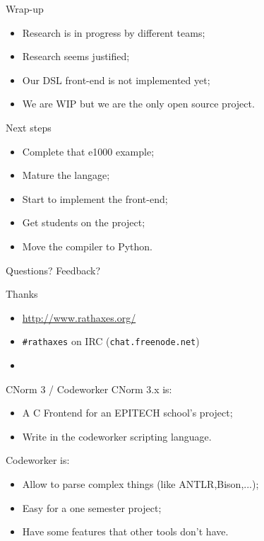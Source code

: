 \documentclass[xcolor={usenames,svgnames}]{beamer}
\begin{document}
\begin{frame}{Wrap-up}
\Large{
\begin{itemize}
\item Research is in progress by different teams;
\item Research seems justified;
\item Our DSL front-end is not implemented yet;
\item We are WIP but we are the only open source project.
\end{itemize}
}
\end{frame}

\begin{frame}{Next steps}
\Large{
\begin{itemize}
\item Complete that e1000 example;
\item Mature the langage;
\item Start to implement the front-end;
\item Get students on the project;
\item Move the compiler to Python.
\end{itemize}
}
\end{frame}

\begin{frame}{Questions? Feedback?}
\begin{center}
\Huge{Thanks}

\end{center}
\vspace{2em}
\begin{itemize}
\item \Large{\url{http://www.rathaxes.org/}}
\item \Large{\texttt{\#rathaxes} on IRC (\texttt{chat.freenode.net})}
\item \Large{\twitter}
\end{itemize}
\end{frame}

\begin{frame}{CNorm 3 / Codeworker}
CNorm 3.x is:
\begin{itemize}
\item A C Frontend for an EPITECH school's project;
\item Write in the codeworker scripting language.
\end{itemize}
Codeworker is:
\begin{itemize}
\item Allow to parse complex things (like ANTLR,Bison,...);
\item Easy for a one semester project;
\item Have some features that other tools don't have.
\end{itemize}
\end{frame}
\end{document}
